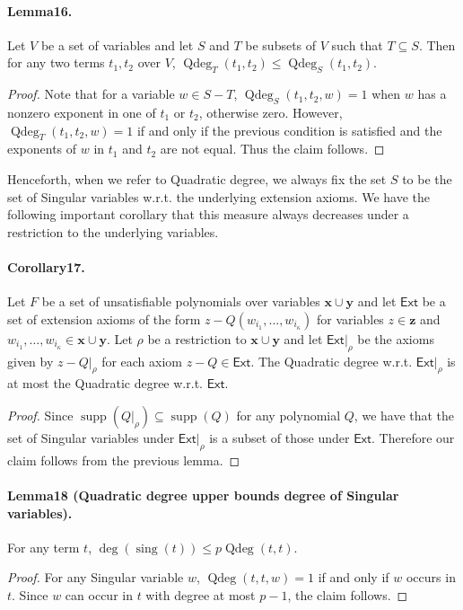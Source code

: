 \documentclass[10pt,a4paper]{article}
\DeclareMathOperator{\supp}{supp}
\DeclareMathOperator{\Qdeg}{Qdeg}
\DeclareMathOperator{\sing}{sing}
\begin{document}
\paragraph{Lemma16.} Let $V$ be a set of variables and let $S$ and $T$ be subsets of $V$ such that $T\subseteq S$. Then for any two terms $t_1,t_2$ over $V$, $\Qdeg_T(t_1,t_2)\leq\Qdeg_S(t_1,t_2)$.
\begin{proof}
Note that for a variable $w\in S-T$, $\Qdeg_S(t_1,t_2,w)=1$ when $w$ has a nonzero exponent in one of $t_1$ or $t_2$, otherwise zero. However, $\Qdeg_T(t_1,t_2,w)=1$ if and only if the previous condition is satisfied and the exponents of $w$ in $t_1$ and $t_2$ are not equal. Thus the claim follows.
\end{proof}
Henceforth, when we refer to Quadratic degree, we always fix the set $S$ to be the set of Singular variables w.r.t. the underlying extension axioms. We have the following important corollary that this measure always decreases under a restriction to the underlying variables.
\paragraph{Corollary17.} Let $F$ be a set of unsatisfiable polynomials over variables $\mathbf x\cup\mathbf y$ and let $\mathsf{Ext}$ be a set of extension axioms of the form $z-Q(w_{i_1},\ldots,w_{i_{\kappa}})$ for variables $z\in\mathbf z$ and $w_{i_1},\ldots,w_{i_{\kappa}}\in\mathbf x\cup\mathbf y$. Let $\rho$ be a restriction to $\mathbf x\cup\mathbf y$ and let $\mathsf{Ext}|_{\rho}$ be the axioms given by $z-Q|_{\rho}$ for each axiom $z-Q\in\mathsf{Ext}$. The Quadratic degree w.r.t. $\mathsf{Ext}|_{\rho}$ is at most the Quadratic degree w.r.t. $\mathsf{Ext}$.
\begin{proof}
Since $\supp(Q|_{\rho})\subseteq\supp(Q)$ for any polynomial $Q$, we have that the set of Singular variables under $\mathsf{Ext}|_{\rho}$ is a subset of those under $\mathsf{Ext}$. Therefore our claim follows from the previous lemma.
\end{proof}
\paragraph{Lemma18 (Quadratic degree upper bounds degree of Singular variables).} For any term $t$, $\deg(\sing(t))\leq p\Qdeg(t,t)$.
\begin{proof}
For any Singular variable $w$, $\Qdeg(t,t,w)=1$ if and only if $w$ occurs in $t$. Since $w$ can occur in $t$ with degree at most $p-1$, the claim follows.
\end{proof}
\end{document}
